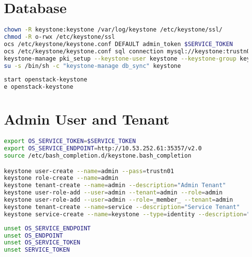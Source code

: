 \documentclass[11pt,letterpaper,oneside]{book}
\begin{document}
\section{Database}

\begin{lstlisting}[caption={Keystone configuration},language=bash]
chown -R keystone:keystone /var/log/keystone /etc/keystone/ssl/
chmod -R o-rwx /etc/keystone/ssl
ocs /etc/keystone/keystone.conf DEFAULT admin_token $SERVICE_TOKEN
ocs /etc/keystone/keystone.conf sql connection mysql://keystone:trustn01@10.53.252.61/keystone
keystone-manage pki_setup --keystone-user keystone --keystone-group keystone 
su -s /bin/sh -c "keystone-manage db_sync" keystone
\end{lstlisting}

\begin{lstlisting}[caption={Start and enable Keystone},language=bash]
start openstack-keystone
e openstack-keystone
\end{lstlisting}


\section{Admin User and Tenant}
\begin{lstlisting}[caption={Keystone ???},language=bash]
export OS_SERVICE_TOKEN=$SERVICE_TOKEN
export OS_SERVICE_ENDPOINT=http://10.53.252.61:35357/v2.0
source /etc/bash_completion.d/keystone.bash_completion 

keystone user-create --name=admin --pass=trustn01
keystone role-create --name=admin
keystone tenant-create --name=admin --description="Admin Tenant"
keystone user-role-add --user=admin --tenant=admin --role=admin
keystone user-role-add --user=admin --role=_member_ --tenant=admin
keystone tenant-create --name=service --description="Service Tenant"
keystone service-create --name=keystone --type=identity --description="OpenStack Identity" keystone endpoint-create --service=keystone --publicurl=http://10.53.252.61:5000/v2.0 --internalurl=http://10.53.252.61:5000/v2.0 --adminurl=http://10.53.252.61:35357/v2.0
\end{lstlisting}

\begin{lstlisting}[caption={Unset Environment variables},language=bash]
unset OS_SERVICE_ENDPOINT
unset OS_ENDPOINT
unset OS_SERVICE_TOKEN
unset SERVICE_TOKEN
\end{lstlisting}

\begin{flushleft}
\end{flushleft}
\end{document}

